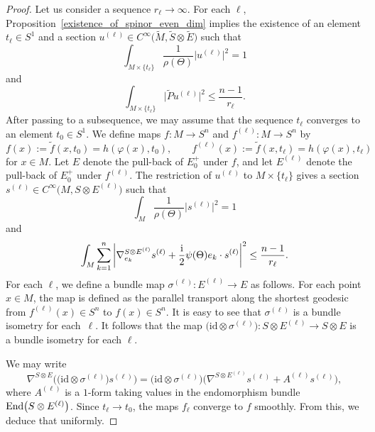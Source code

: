 \documentclass[11pt]{article}
\numberwithin{equation}{section}
\numberwithin{equation}{section}
\newcommand{\id}{\mathrm{id}}
\begin{document}
\begin{proof}
Let us consider a sequence $r_\ell \to \infty$. For each $\ell$, Proposition~\ref{existence_of_spinor_even_dim} implies the existence of an element $t_\ell \in S^1$ and a section $u^{(\ell)} \in C^\infty\big(\tilde{M},\tilde{S} \otimes \tilde{E}\big)$ such that
\[
 \int_{M \times \{t_\ell\}} \frac{1}{\rho(\Theta)}\big|u^{(\ell)}\big|^2 = 1
\]
and
\[\int_{M \times \{t_\ell\}} \big|\tilde{P} u^{(\ell)}\big|^2 \leq \frac{n-1}{r_\ell}.
\]
After passing to a subsequence, we may assume that the sequence $t_\ell$ converges to an element $t_0 \in S^1$. We define maps $f\colon M \to S^n$ and $f^{(\ell)}\colon M \to S^n$ by
\[
 f(x) := \tilde{f}(x,t_0) = h(\varphi(x),t_0), \qquad f^{(\ell)}(x) := \tilde{f}(x,t_\ell) = h(\varphi(x) ,t_\ell)
\]
for $x \in M$.
Let $E$ denote the pull-back of $E_0^+$ under $f$, and let $E^{(\ell)}$ denote the pull-back of $E_0^+$ under $f^{(\ell)}$.
The restriction of $u^{(\ell)}$ to $M \times \{t_\ell\}$ gives a section $s^{(\ell)} \in C^\infty\big(M,S \otimes E^{(\ell)}\big)$ such that
\[
 \int_M \frac{1}{\rho(\Theta)}\big|s^{(\ell)}\big|^2 = 1
 \]
and
\begin{equation}
 \int_M \sum_{k=1}^n \left| \nabla_{e_k}^{S \otimes E^{(\ell)}} s^{(\ell)} + \frac{\rm i}{2} \psi(\Theta) e_k \cdot s^{(\ell)} \right|^2 \leq \frac{n-1}{r_\ell}.
\label{eq:almostflat}
\end{equation}
For each $\ell$, we define a bundle map $\sigma^{(\ell)}\colon E^{(\ell)} \to E$ as follows.
For each point $x \in M$, the map  is defined as the parallel transport along the shortest geodesic from $f^{(\ell)}(x) \in S^n$ to $f(x) \in S^n$.
It is easy to see that $\sigma^{(\ell)}$ is a bundle isometry for each~$\ell$. It follows that the map $\big(\id \otimes \sigma^{(\ell)}\big)\colon S \otimes E^{(\ell)} \to S \otimes E$ is a bundle isometry for each $\ell$.

We may write
\begin{equation}
\label{eq:A_l_term}
\nabla^{S \otimes E}\big(\big(\id \otimes \sigma^{(\ell)}\big) s^{(\ell)}\big) = \big(\id \otimes \sigma^{(\ell)}\big) \big(\nabla^{S \otimes E^{(\ell)}} s^{(\ell)} + A^{(\ell)} s^{(\ell)}\big),
\end{equation}
where $A^{(\ell)}$ is a $1$-form taking values in the endomorphism bundle $\text{\rm End}\big(S \otimes E^{(\ell)}\big)$. Since $t_\ell \to t_0$, the maps $f_\ell$ converge to $f$ smoothly. From this, we deduce that  uniformly.


\end{proof}
\end{document}

